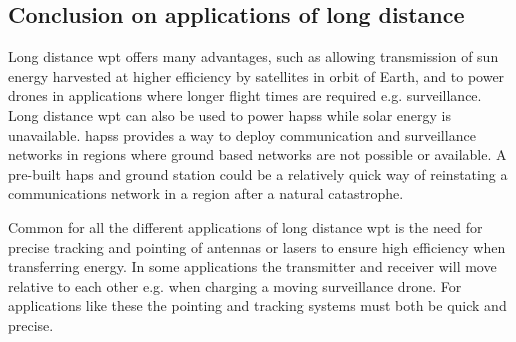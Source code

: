 \subsection{Conclusion on applications of long distance }
Long distance \gls{wpt} offers many advantages, such as allowing transmission of sun energy harvested at higher efficiency by satellites in orbit of Earth, and to power drones in applications where longer flight times are required e.g. surveillance. Long distance \gls{wpt} can also be used to power \glspl{haps} while solar energy is unavailable. \glspl{haps} provides a way to deploy communication and surveillance networks in regions where ground based networks are not possible or available. A pre-built \gls{haps} and ground station could be a relatively quick way of reinstating a communications network in a region after a natural catastrophe.

Common for all the different applications of long distance \gls{wpt} is the need for precise tracking and pointing of antennas or lasers to ensure high efficiency when transferring energy. In some applications the transmitter and receiver will move relative to each other e.g. when charging a moving surveillance drone. For applications like these the pointing and tracking systems must both be quick and precise.
